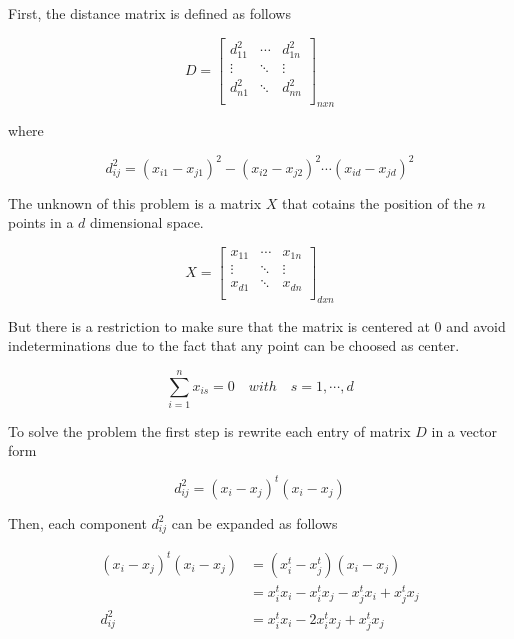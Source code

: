 \documentclass[12pt,journal]{IEEEtran}
\begin{document}
    First, the distance matrix is defined as follows

    \[
        D =
        \begin{bmatrix}
            d_{11}^2 & \cdots & d_{1n}^2\\
            \vdots   & \ddots & \vdots  \\
            d_{n1}^2 & \ddots & d_{nn}^2\\
        \end{bmatrix}_{n x n}
    \]

    where

    \begin{equation*}
        d_{ij}^2 = (x_{i1}-x_{j1})^2 - (x_{i2}-x_{j2})^2 \cdots (x_{id}-x_{jd})^2
    \end{equation*}

    The unknown of this problem is a matrix $X$ that cotains the position of the
    $n$ points in a $d$ dimensional space.

    \[
        X =
        \begin{bmatrix}
            x_{11} & \cdots & x_{1n}\\
            \vdots & \ddots & \vdots\\
            x_{d1} & \ddots & x_{dn}\\
        \end{bmatrix}_{d x n}
    \]

    But there is a restriction to make sure that the matrix is centered at 0 and
    avoid indeterminations due to the fact that any point can be choosed as center.

    \begin{equation*}
        \sum_{i=1}^n x_{is} = 0 \quad with \quad s = 1, \cdots, d
    \end{equation*}

    To solve the problem the first step is rewrite each entry of matrix $D$ in
    a vector form

    \begin{equation*}
        d_{ij}^2 = (x_i-x_j)^t (x_i-x_j)
    \end{equation*}

    Then, each component $d_{ij}^2$ can be expanded as follows

    \begin{equation*}
        \begin{aligned}
            (x_i-x_j)^t (x_i-x_j) &= (x_i^t-x_j^t) (x_i-x_j)\\
                                  &= x_i^t x_i - x_i^t x_j - x_j^t x_i + x_j^t x_j\\
                         d_{ij}^2 &= x_i^t x_i - 2 x_i^t x_j + x_j^t x_j\\
        \end{aligned}
    \end{equation*}
\end{document}
